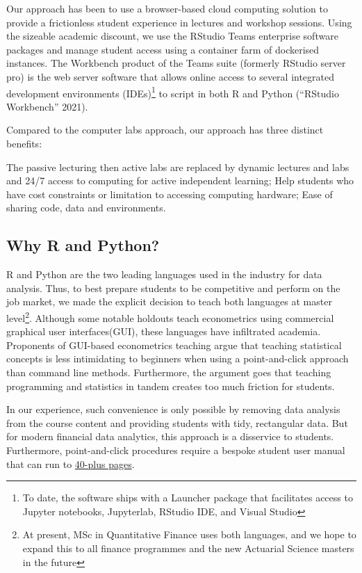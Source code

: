 \documentclass{article}
\begin{document}
Our approach has been to use a browser-based cloud computing solution to
provide a frictionless student experience in lectures and workshop
sessions. Using the sizeable academic discount, we use the RStudio Teams
enterprise software packages and manage student access using a container
farm of dockerised instances. The Workbench product of the Teams suite
(formerly RStudio server pro) is the web server software that allows
online access to several integrated development environments
(IDEs)\footnote{To date, the software ships with a Launcher package that
  facilitates access to Jupyter notebooks, Jupyterlab, RStudio IDE, and
  Visual Studio} to script in both R and Python (``RStudio Workbench''
2021).

Compared to the computer labs approach, our approach has three distinct
benefits:

The passive lecturing then active labs are replaced by dynamic lectures
and labs and 24/7 access to computing for active independent learning;
Help students who have cost constraints or limitation to accessing
computing hardware; Ease of sharing code, data and environments.

\hypertarget{why-r-and-python}{%
\subsection{Why R and Python?}\label{why-r-and-python}}

R and Python are the two leading languages used in the industry for data
analysis. Thus, to best prepare students to be competitive and perform
on the job market, we made the explicit decision to teach both languages
at master level\footnote{At present, MSc in Quantitative Finance uses
  both languages, and we hope to expand this to all finance programmes
  and the new Actuarial Science masters in the future}. Although some
notable holdouts teach econometrics using commercial graphical user
interfaces(GUI), these languages have infiltrated academia. Proponents
of GUI-based econometrics teaching argue that teaching statistical
concepts is less intimidating to beginners when using a point-and-click
approach than command line methods. Furthermore, the argument goes that
teaching programming and statistics in tandem creates too much friction
for students.

In our experience, such convenience is only possible by removing data
analysis from the course content and providing students with tidy,
rectangular data. But for modern financial data analytics, this approach
is a disservice to students. Furthermore, point-and-click procedures
require a bespoke student user manual that can run to
\href{https://github.com/barryquinn1/FMLmaterial/blob/27d8094fee39fa0284d3a0bfc10e38dcd3bebcac/Introducing\%20Stata.pdf}{40-plus
pages}.
\end{document}
